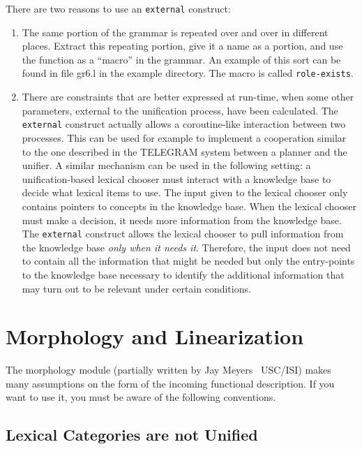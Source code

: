 \documentclass[10pt,a4paper]{report}
\begin{document}
There are two reasons to use an {\tt external} construct:
\begin{enumerate}
\item The same portion of the grammar is repeated over and over in different
places.  Extract this repeating portion, give it a name as a portion, and
use the function as a ``macro'' in the grammar.  An example of this sort
can be found in file gr6.l in the example directory.  The macro is called
{\tt role-exists}. 

\item There are constraints that are better expressed at run-time, when some
other parameters, external to the unification process, have been
calculated.  The {\tt external} construct actually allows a coroutine-like
interaction between two processes.  This can be used for example to
implement a cooperation similar to the one described in the \textsc{TELEGRAM}
system \cite{Appelt83} between a planner and the unifier.  A similar
mechanism can be used in the following setting:  a unification-based
lexical chooser must interact with a knowledge base to decide what lexical
items to use.  The input given to the lexical chooser only contains
pointers to concepts in the knowledge base.  When the lexical chooser must
make a decision, it needs more information from the knowledge base.  The
{\tt external} construct allows the lexical chooser to pull information from
the knowledge base {\em only when it needs it}.  Therefore, the input does
not need to contain all the information that might be needed but only the
entry-points to the knowledge base necessary to identify the additional
information that may turn out to be relevant under certain conditions.
\end{enumerate}





\chapter{Morphology and Linearization}
\label{sect-morphology}

The morphology module (partially written by Jay Meyers \ USC/ISI) makes
many assumptions on the form of the incoming functional description.  If
you want to use it, you must be aware of the following conventions.


\section{Lexical Categories are not Unified}
\end{document}
